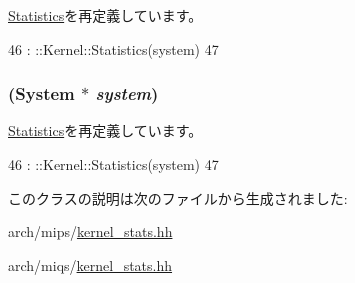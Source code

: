 \hyperlink{classKernel_1_1Statistics_a83aac6d65afe578fbf92b926ce7c1c3c}{Statistics}を再定義しています。


\begin{DoxyCode}
46                                : ::Kernel::Statistics(system)
47     {}
\end{DoxyCode}
\hypertarget{classMipsISA_1_1Kernel_1_1Statistics_a83aac6d65afe578fbf92b926ce7c1c3c}{
\subsubsection[{Statistics}]{ ({\bf System} $\ast$ {\em system})}}
\label{classMipsISA_1_1Kernel_1_1Statistics_a83aac6d65afe578fbf92b926ce7c1c3c}


\hyperlink{classKernel_1_1Statistics_a83aac6d65afe578fbf92b926ce7c1c3c}{Statistics}を再定義しています。


\begin{DoxyCode}
46                                : ::Kernel::Statistics(system)
47     {}
\end{DoxyCode}


このクラスの説明は次のファイルから生成されました:\begin{DoxyCompactItemize}
\item 
arch/mips/\hyperlink{arch_2mips_2kernel__stats_8hh}{kernel\_\-stats.hh}\item 
arch/miqs/\hyperlink{arch_2miqs_2kernel__stats_8hh}{kernel\_\-stats.hh}\end{DoxyCompactItemize}
